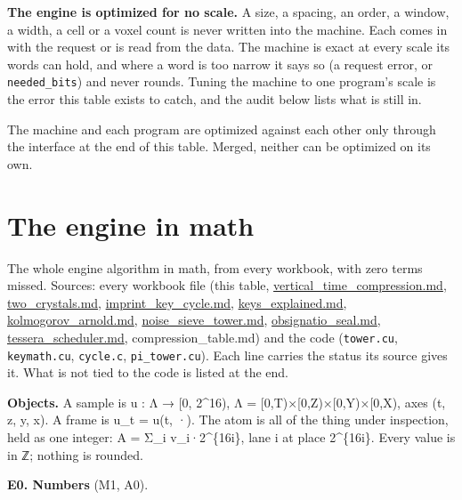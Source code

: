 \textbf{The engine is optimized for no scale.} A size, a spacing, an order, a window, a width, a cell or a voxel count is never written into the machine. Each comes in with the request or is read from the data. The machine is exact at every scale its words can hold, and where a word is too narrow it says so (a request error, or \texttt{needed\_\allowbreak{}bits}) and never rounds. Tuning the machine to one program's scale is the error this table exists to catch, and the audit below lists what is still in.

The machine and each program are optimized against each other only through the interface at the end of this table. Merged, neither can be optimized on its own.

\section{\texorpdfstring{The engine in math}{The engine in math}}

The whole engine algorithm in math, from every workbook, with zero terms missed. Sources: every workbook file (this table, \hyperref[chap:vertical-time-compression]{vertical\_\allowbreak{}time\_\allowbreak{}compression.md}, \hyperref[chap:two-crystals]{two\_\allowbreak{}crystals.md}, \hyperref[chap:imprint-key-cycle]{imprint\_\allowbreak{}key\_\allowbreak{}cycle.md}, \hyperref[chap:keys-explained]{keys\_\allowbreak{}explained.md}, \hyperref[chap:kolmogorov-arnold]{kolmogorov\_\allowbreak{}arnold.md}, \hyperref[chap:noise-sieve-tower]{noise\_\allowbreak{}sieve\_\allowbreak{}tower.md}, \hyperref[chap:obsignatio-seal]{obsignatio\_\allowbreak{}seal.md}, \hyperref[chap:tessera-scheduler]{tessera\_\allowbreak{}scheduler.md}, compression\_\allowbreak{}table.md) and the code (\texttt{tower.\allowbreak{}cu}, \texttt{keymath.\allowbreak{}cu}, \texttt{cycle.\allowbreak{}c}, \texttt{pi\_\allowbreak{}tower.\allowbreak{}cu}). Each line carries the status its source gives it. What is not tied to the code is listed at the end.

\textbf{Objects.} A sample is u : Λ → [0, 2\textasciicircum{}16), Λ = [0,T)×[0,Z)×[0,Y)×[0,X), axes (t, z, y, x). A frame is u\_\allowbreak{}t = u(t, ·). The atom is all of the thing under inspection, held as one integer: A = Σ\_\allowbreak{}i v\_\allowbreak{}i·2\textasciicircum{}\{16i\}, lane i at place 2\textasciicircum{}\{16i\}. Every value is in ℤ; nothing is rounded.

\textbf{E0. Numbers} (M1, A0).

